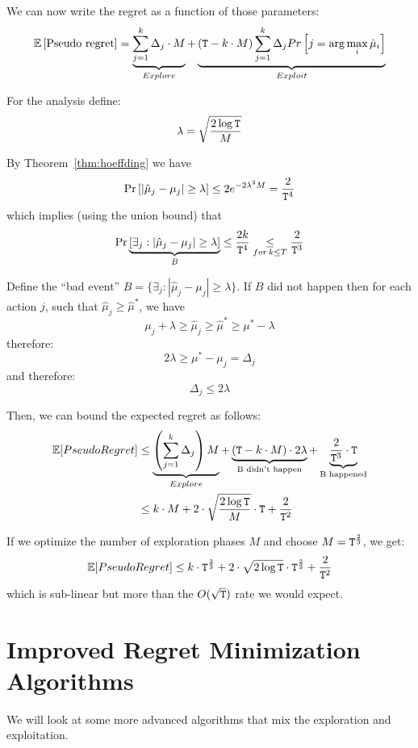 We can now write the regret as a function of those parameters:
\[
\mathbb{E}\left[\text{Pseudo regret}\right]=\underbrace{{\displaystyle
\sum_{j=1}^{k}\Delta_{j}\cdot
M}}_{Explore}+\underbrace{\left({\tt T}-k\cdot M\right){\displaystyle
\sum_{j=1}^{k}\Delta_{j}Pr\left[j=\arg\max_{i}\hat{\mu}_{i}\right]}}_{Exploit}
\]

For the analysis define:
\[
\lambda=\sqrt{\frac{2\log {\tt T}}{M}}
\]

By Theorem~\ref{thm:hoeffding} we have
\[
\Pr\left[\left|\hat{\mu}_{j}-\mu_{j}\right|\ge\lambda\right]  \le
2e^{-2\lambda^2 M}=\frac{2}{{\tt T}^{4}}
\]
which implies (using the union bound) that
\[
\Pr\underbrace{\left[\exists_{j}:\left|\hat{\mu}_{j}-\mu_{j}\right|\ge\lambda\right]}_{B}
 \le  \frac{2k}{{\tt T}^{4}}\underset{for\,k\leq T}{\leq}\frac{2}{{\tt T}^{3}}
\]

Define the ``bad event''
$B=\{\exists_{j}:\left|\hat{\mu}_{j}-\mu_{j}\right|\ge\lambda\}$. If
$B$ did not happen then for each action $j$, such that
$\hat{\mu}_{j}\ge\hat{\mu}^{*}$, we have
\[
\mu_{j}+\lambda\ge\hat{\mu}_{j}\ge\hat{\mu}^{*}\ge\mu^{*}-\lambda
\]
therefore:
\[
2\lambda\ge\mu^{*}-\mu_{j}=\Delta_{j}
\]
and therefore:
\[
\Delta_{j}\le2\lambda
\]

Then, we can bound the expected regret as follows:
\begin{align*}
\mathbb{E}[PseudoRegret] & \leq  \underbrace{\left({\displaystyle
\sum_{j=1}^{k}\Delta_{j}}\right)M}_{Explore}+\underbrace{\left({\tt T}-k\cdot
M\right)\cdot2\lambda}_{\text{B didn't
happen}}+\underbrace{\frac{2}{{\tt T}^{3}}\cdot {\tt T}}_{\text{B happened}}\\
 & \leq  k\cdot M+2\cdot\sqrt{\frac{2\log {\tt T}}{M}}\cdot {\tt T}+\frac{2}{{\tt T}^{2}}
\end{align*}

If we optimize the number of exploration phases $M$ and choose $M={\tt T}^{\frac{2}{3}}$,
we get:
\[
\mathbb{E}[PseudoRegret]  \leq 
k\cdot {\tt T}^{\frac{2}{3}}+2\cdot\sqrt{2\log {\tt T}}\cdot
{\tt T}^{\frac{2}{3}}+\frac{2}{{\tt T}^{2}}
\]
which is sub-linear but more than the $O(\sqrt{{\tt T}})$ rate we would
expect.

\section{Improved Regret Minimization Algorithms}

We will look at some more advanced algorithms that mix the
exploration and exploitation.

